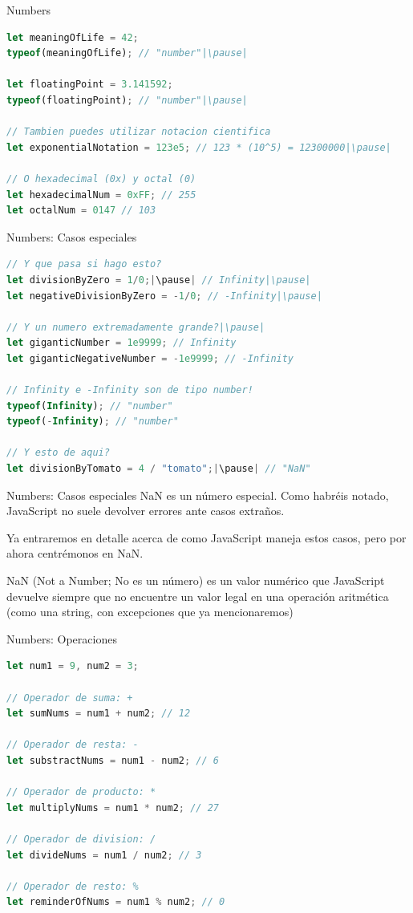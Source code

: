 \documentclass{beamer}
\begin{document}
\begin{frame}[fragile]{Numbers}
\begin{lstlisting}[language=JavaScript]
let meaningOfLife = 42;
typeof(meaningOfLife); // "number"|\pause|

let floatingPoint = 3.141592;
typeof(floatingPoint); // "number"|\pause|

// Tambien puedes utilizar notacion cientifica
let exponentialNotation = 123e5; // 123 * (10^5) = 12300000|\pause|

// O hexadecimal (0x) y octal (0)
let hexadecimalNum = 0xFF; // 255
let octalNum = 0147 // 103
\end{lstlisting}    
\end{frame}

\begin{frame}[fragile]{Numbers: Casos especiales}
\begin{lstlisting}[language=JavaScript]
// Y que pasa si hago esto?
let divisionByZero = 1/0;|\pause| // Infinity|\pause|
let negativeDivisionByZero = -1/0; // -Infinity|\pause|

// Y un numero extremadamente grande?|\pause|
let giganticNumber = 1e9999; // Infinity
let giganticNegativeNumber = -1e9999; // -Infinity

// Infinity e -Infinity son de tipo number!
typeof(Infinity); // "number"
typeof(-Infinity); // "number"

// Y esto de aqui?
let divisionByTomato = 4 / "tomato";|\pause| // "NaN"
\end{lstlisting}    
\end{frame}

\begin{frame}{Numbers: Casos especiales}
NaN es un número especial. Como habréis notado, JavaScript no suele devolver errores ante casos extraños.

Ya entraremos en detalle acerca de como JavaScript maneja estos casos, pero por ahora centrémonos en NaN.\pause

NaN (Not a Number; No es un número) es un valor numérico que JavaScript devuelve siempre que no encuentre un valor legal en una operación aritmética (como una string, con excepciones que ya mencionaremos)
\end{frame}

\begin{frame}[fragile]{Numbers: Operaciones}
\begin{lstlisting}[language=JavaScript]
let num1 = 9, num2 = 3;

// Operador de suma: +
let sumNums = num1 + num2; // 12

// Operador de resta: -
let substractNums = num1 - num2; // 6

// Operador de producto: *
let multiplyNums = num1 * num2; // 27

// Operador de division: /
let divideNums = num1 / num2; // 3

// Operador de resto: %
let reminderOfNums = num1 % num2; // 0
\end{lstlisting}
\end{frame}
\end{document}

